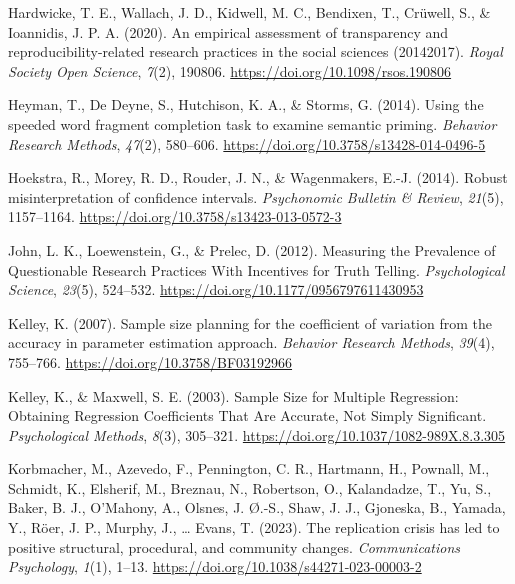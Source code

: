 \documentclass[
  man]{apa7}
\newlength{\cslhangindent}
\newenvironment{CSLReferences}[2] %
 {\begin{list}{}{%
  \setlength{\itemindent}{0pt}
  \setlength{\leftmargin}{0pt}
  \setlength{\parsep}{0pt}
  \ifodd #1
   \setlength{\leftmargin}{\cslhangindent}
   \setlength{\itemindent}{-1\cslhangindent}
  \fi
  \setlength{\itemsep}{#2\baselineskip}}}
 {\end{list}}
\begin{document}
\begin{CSLReferences}{1}{0}
Hardwicke, T. E., Wallach, J. D., Kidwell, M. C., Bendixen, T., Crüwell, S., \& Ioannidis, J. P. A. (2020). An empirical assessment of transparency and reproducibility-related research practices in the social sciences (2014{\textendash}2017). \emph{Royal Society Open Science}, \emph{7}(2), 190806. \url{https://doi.org/10.1098/rsos.190806}

Heyman, T., De Deyne, S., Hutchison, K. A., \& Storms, G. (2014). Using the speeded word fragment completion task to examine semantic priming. \emph{Behavior Research Methods}, \emph{47}(2), 580--606. \url{https://doi.org/10.3758/s13428-014-0496-5}

Hoekstra, R., Morey, R. D., Rouder, J. N., \& Wagenmakers, E.-J. (2014). Robust misinterpretation of confidence intervals. \emph{Psychonomic Bulletin \& Review}, \emph{21}(5), 1157--1164. \url{https://doi.org/10.3758/s13423-013-0572-3}

John, L. K., Loewenstein, G., \& Prelec, D. (2012). Measuring the Prevalence of Questionable Research Practices With Incentives for Truth Telling. \emph{Psychological Science}, \emph{23}(5), 524--532. \url{https://doi.org/10.1177/0956797611430953}

Kelley, K. (2007). Sample size planning for the coefficient of variation from the accuracy in parameter estimation approach. \emph{Behavior Research Methods}, \emph{39}(4), 755--766. \url{https://doi.org/10.3758/BF03192966}

Kelley, K., \& Maxwell, S. E. (2003). Sample Size for Multiple Regression: Obtaining Regression Coefficients That Are Accurate, Not Simply Significant. \emph{Psychological Methods}, \emph{8}(3), 305--321. \url{https://doi.org/10.1037/1082-989X.8.3.305}

Korbmacher, M., Azevedo, F., Pennington, C. R., Hartmann, H., Pownall, M., Schmidt, K., Elsherif, M., Breznau, N., Robertson, O., Kalandadze, T., Yu, S., Baker, B. J., O'Mahony, A., Olsnes, J. Ø.-S., Shaw, J. J., Gjoneska, B., Yamada, Y., Röer, J. P., Murphy, J., \ldots{} Evans, T. (2023). The replication crisis has led to positive structural, procedural, and community changes. \emph{Communications Psychology}, \emph{1}(1), 1--13. \url{https://doi.org/10.1038/s44271-023-00003-2}


\end{CSLReferences}
\end{document}
